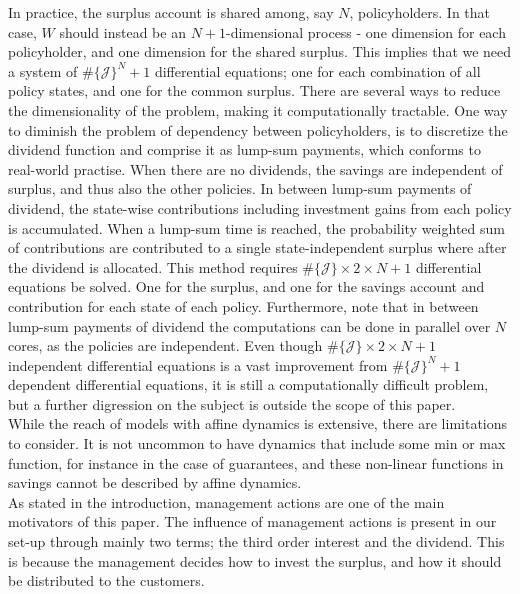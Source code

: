 \documentclass[12pt]{article}
\theoremstyle{my_thm}
\begin{document}
In practice, the surplus account is shared among, say $N$, policyholders. In that case, $W$ should instead be an $N+1$-dimensional process - one dimension for each policyholder, and one dimension for the shared surplus. This implies that we need a system of $\# \{ \mathcal{J} \}^N+1$ differential equations; one for each combination of all policy states, and one for the common surplus. There are several ways to reduce the dimensionality of the problem, making it computationally tractable. One way to diminish the problem of dependency between policyholders, is to discretize the dividend function and comprise it as lump-sum payments, which conforms to real-world practise. When there are no dividends, the savings are independent of surplus, and thus also the other policies. In between lump-sum payments of dividend, the state-wise contributions including investment gains from each policy is accumulated. When a lump-sum time is reached, the probability weighted sum of contributions are contributed to a single state-independent surplus where after the dividend is allocated. This method requires $\# \{ \mathcal{J} \} \times 2 \times N + 1$ differential equations be solved. One for the surplus, and one for the savings account and contribution for each state of each policy. Furthermore, note that in between lump-sum payments of dividend the computations can be done in parallel over $N$ cores, as the policies are independent. Even though $\# \{ \mathcal{J} \} \times 2 \times N + 1$ independent differential equations is a vast improvement from $\# \{ \mathcal{J} \}^N + 1$ dependent differential equations, it is still a computationally difficult problem, but a further digression on the subject is outside the scope of this paper.
\\[12pt]
While the reach of models with affine dynamics is extensive, there are limitations to consider. It is not uncommon to have dynamics that include some min or max function, for instance in the case of guarantees, and these non-linear functions in savings cannot be described by affine dynamics. \\
As stated in the introduction, management actions are one of the main motivators of this paper. The influence of management actions is present in our set-up through mainly two terms; the third order interest and the dividend. This is because the management decides how to invest the surplus, and how it should be distributed to the customers.
\end{document}
